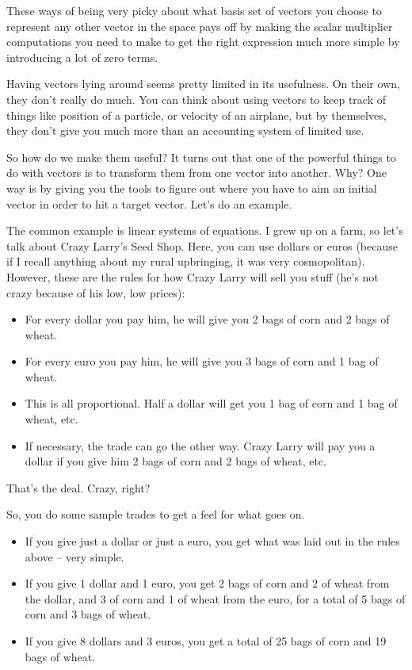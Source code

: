 \documentclass[
]{book}
\providecommand{\tightlist}{%
  \setlength{\itemsep}{0pt}\setlength{\parskip}{0pt}}
\begin{document}
These ways of being very picky about what basis set of vectors you choose to represent any other vector in the space pays off by making the scalar multiplier computations you need to make to get the right expression much more simple by introducing a lot of zero terms.

Having vectors lying around seems pretty limited in its usefulness. On their own, they don't really do much. You can think about using vectors to keep track of things like position of a particle, or velocity of an airplane, but by themselves, they don't give you much more than an accounting system of limited use.

So how do we make them useful? It turns out that one of the powerful things to do with vectors is to transform them from one vector into another. Why? One way is by giving you the tools to figure out where you have to aim an initial vector in order to hit a target vector. Let's do an example.

The common example is linear systems of equations. I grew up on a farm, so let's talk about Crazy Larry's Seed Shop. Here, you can use dollars or euros (because if I recall anything about my rural upbringing, it was very cosmopolitan). However, these are the rules for how Crazy Larry will sell you stuff (he's not crazy because of his low, low prices):

\begin{itemize}
\tightlist
\item
  For every dollar you pay him, he will give you 2 bags of corn and 2 bags of wheat.
\item
  For every euro you pay him, he will give you 3 bags of corn and 1 bag of wheat.
\item
  This is all proportional. Half a dollar will get you 1 bag of corn and 1 bag of wheat, etc.
\item
  If necessary, the trade can go the other way. Crazy Larry will pay you a dollar if you give him 2 bags of corn and 2 bags of wheat, etc.
\end{itemize}

That's the deal. Crazy, right?

So, you do some sample trades to get a feel for what goes on.

\begin{itemize}
\tightlist
\item
  If you give just a dollar or just a euro, you get what was laid out in the rules above -- very simple.
\item
  If you give 1 dollar and 1 euro, you get 2 bags of corn and 2 of wheat from the dollar, and 3 of corn and 1 of wheat from the euro, for a total of 5 bags of corn and 3 bags of wheat.
\item
  If you give 8 dollars and 3 euros, you get a total of 25 bags of corn and 19 bags of wheat.
\end{itemize}
\end{document}
